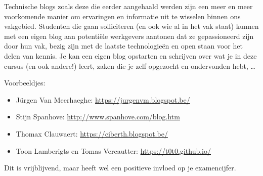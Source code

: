 Technische blogs zoals deze die eerder aangehaald werden zijn een meer en meer voorkomende manier om ervaringen en informatie uit te wisselen binnen ons vakgebied. Studenten die gaan solliciteren (en ook wie al in het vak staat) kunnen met een eigen blog aan potentiële werkgevers aantonen dat ze gepassioneerd zijn door hun vak, bezig zijn met de laatste technologieën en open staan voor het delen van kennis. Je kan een eigen blog opstarten en schrijven over wat je in deze cursus (en ook andere!) leert, zaken die je zelf opgezocht en ondervonden hebt, \ldots

Voorbeeldjes:

\begin{itemize}
\item Jürgen Van Meerhaeghe: \url{https://jurgenvm.blogspot.be/}
\item Stijn Spanhove: \url{http://www.spanhove.com/blog.htm}
\item Thomax Clauwaert: \url{https://ciberth.blogspot.be/}
\item Toon Lamberigts en Tomas Vercautter: \url{https://t0t0.github.io/}
\end{itemize}

Dit is vrijblijvend, maar heeft wel een positieve invloed op je examencijfer.

